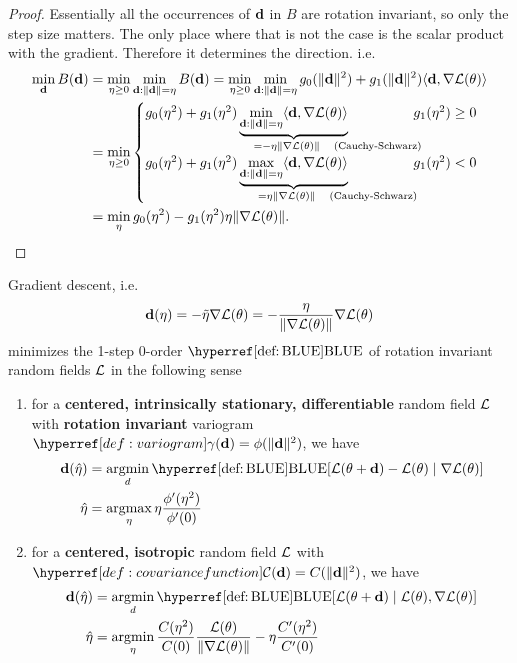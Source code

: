 \begin{proof}
	Essentially all the occurrences of \(\mathbf{d}\) in \(B\) are
	rotation invariant, so only the step size matters. The only place where that
	is not the case is the scalar product with the gradient. Therefore it
	determines the direction. i.e.
	\begin{align*}
		\min_{\step} B(\step)
		&= \min_{\lr\ge 0}\min_{\step:\|\step\|=\lr} B(\step)
		= \min_{\lr\ge 0}\min_{\step:\|\step\|=\lr}
		g_0(\|\step\|^2)	
		+ g_1(\|\step\|^2) \langle \step, \grad\Loss(\param)\rangle\\
		&= \min_{\lr\ge 0}
		\begin{cases}
			g_0(\lr^2)	
			+ g_1(\lr^2)
			\underbrace{\min_{\step:\|\step\|=\lr}\langle \step, \grad\Loss(\param)\rangle}_{
				= -\eta \|\grad \Loss(\param)\| \quad \mathrlap{\text{(Cauchy-Schwarz)}}
			}\hphantom{\text{Schwarz}} & g_1(\lr^2) \ge 0
			\\
			g_0(\lr^2)	
			+ g_1(\lr^2)
			\underbrace{\max_{\step:\|\step\|=\lr}\langle \step, \grad\Loss(\param)\rangle}_{
				= \eta \|\grad \Loss(\param)\| \quad \mathrlap{\text{(Cauchy-Schwarz)}}
			}\hphantom{\text{Schwarz}} & g_1(\lr^2) < 0
		\end{cases}\\
		&= \min_{\lr} g_0(\lr^2)	
			- g_1(\lr^2)\lr \|\grad\Loss(\param)\|.
		\qedhere
	\end{align*}
\end{proof}

\begin{theorem}\label{thm: bayesian descent}
	Gradient descent, i.e. 
	\begin{equation*}
		\mathbf{d}(\eta) = - \tilde{\eta} \nabla\mathcal{L}(\theta)
		= - \frac{\eta}{\|\nabla\mathcal{L}(\theta)\|} \nabla\mathcal{L}(\theta)
	\end{equation*}
	minimizes the 1-step 0-order \(\BLUE\) of rotation invariant random fields
	\(\mathcal{L}\) in the following sense
	\begin{enumerate}
		\item for a \textbf{centered, intrinsically stationary, differentiable}
		random field \(\mathcal{L}\) with \textbf{rotation invariant} variogram
		\(\variogram(\step) = \phi(\|\step\|^2)\), we have
		\begin{align*}
			\step(\hat{\lr})
			&= \argmin_{d}
			\BLUE[\Loss(\param + \step) - \Loss(\param)\mid \grad\Loss(\param)]\\
			\hat{\lr}
			&= \argmax_{\lr} \lr\frac{\phi'(\lr^2)}{\phi'(0)}
		\end{align*}


		\item for a \textbf{centered, isotropic} random field \(\mathcal{L}\) with
		\(\C(\step)=C(\|\step\|^2)\), we have
		\begin{align*}
			\step(\hat{\lr})
			&= \argmin_{d}
			\BLUE[\Loss(\param + \step)\mid \Loss(\param), \grad\Loss(\param)]\\
			\hat{\lr}
			&= \argmin_{\lr}\frac{\sqC(\lr^2)}{\sqC(0)} \frac{\Loss(\param)}{\|\grad\Loss(\param)\|}
			-  \lr\frac{\sqC'(\lr^2)}{\sqC'(0)}
		\end{align*}
	\end{enumerate}
\end{theorem}

